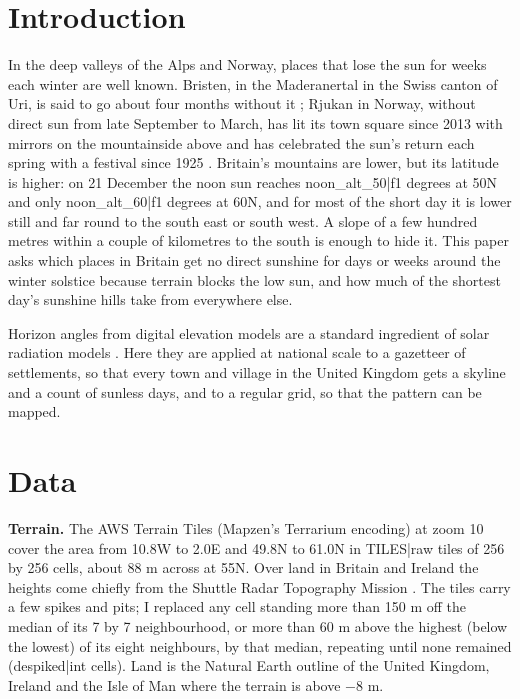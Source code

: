 \documentclass[11pt,a4paper]{article}
\begin{document}
\section{Introduction}
In the deep valleys of the Alps and Norway, places that lose the sun for weeks each winter are well known. Bristen, in the Maderanertal in the Swiss canton of Uri, is said to go about four months without it \citep{bluewin}; Rjukan in Norway, without direct sun from late September to March, has lit its town square since 2013 with mirrors on the mountainside above \citep{opn2013} and has celebrated the sun's return each spring with a festival since 1925 \citep{rjukan}. Britain's mountains are lower, but its latitude is higher: on 21 December the noon sun reaches {{noon_alt_50|f1}} degrees at 50\textdegree{}N and only {{noon_alt_60|f1}} degrees at 60\textdegree{}N, and for most of the short day it is lower still and far round to the south east or south west. A slope of a few hundred metres within a couple of kilometres to the south is enough to hide it. This paper asks which places in Britain get no direct sunshine for days or weeks around the winter solstice because terrain blocks the low sun, and how much of the shortest day's sunshine hills take from everywhere else.

Horizon angles from digital elevation models are a standard ingredient of solar radiation models \citep{dozier1981,hofierka2002}. Here they are applied at national scale to a gazetteer of settlements, so that every town and village in the United Kingdom gets a skyline and a count of sunless days, and to a regular grid, so that the pattern can be mapped.

\section{Data}
\textbf{Terrain.} The AWS Terrain Tiles (Mapzen's Terrarium encoding) at zoom 10 cover the area from 10.8\textdegree{}W to 2.0\textdegree{}E and 49.8\textdegree{}N to 61.0\textdegree{}N in {{TILES|raw}} tiles of 256 by 256 cells, about 88 m across at 55\textdegree{}N. Over land in Britain and Ireland the heights come chiefly from the Shuttle Radar Topography Mission \citep{farr2007}. The tiles carry a few spikes and pits; I replaced any cell standing more than 150 m off the median of its 7 by 7 neighbourhood, or more than 60 m above the highest (below the lowest) of its eight neighbours, by that median, repeating until none remained ({{despiked|int}} cells). Land is the Natural Earth outline of the United Kingdom, Ireland and the Isle of Man where the terrain is above $-8$ m.
\end{document}
